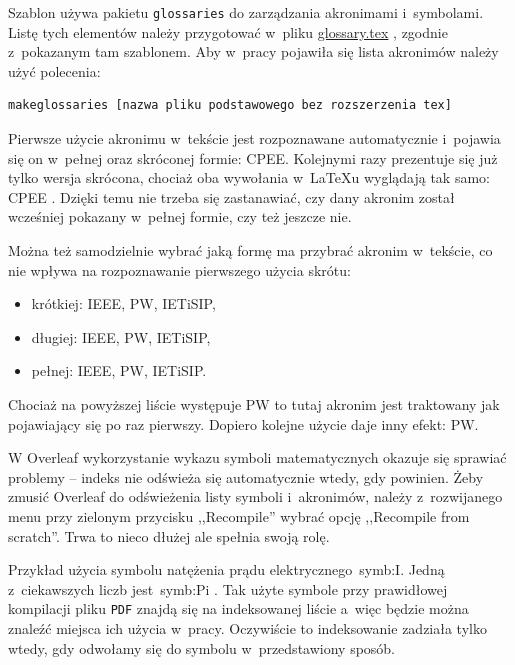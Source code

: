 Szablon używa pakietu \texttt{glossaries}
do zarządzania akronimami i~symbolami. Listę tych elementów należy przygotować w~pliku
\href{./glossary.tex}{glossary.tex}
, zgodnie z~pokazanym tam szablonem. Aby w~pracy pojawiła się lista akronimów należy użyć polecenia:

\begin{lstlisting}[language=bash,
    numbers=none,
    caption=Wygenerowanie listy skrótów i~symboli,
    label={lst:gloss}]
makeglossaries [nazwa pliku podstawowego bez rozszerzenia tex]
\end{lstlisting}

Pierwsze użycie akronimu w~tekście jest rozpoznawane automatycznie i~pojawia się on w~pełnej oraz skróconej formie:
\gls{CPEE}. Kolejnymi razy prezentuje się już tylko wersja skrócona, chociaż oba wywołania w~\LaTeX{u}
wyglądają tak samo: \gls{CPEE}
. Dzięki temu nie trzeba się zastanawiać, czy dany akronim został wcześniej pokazany w~pełnej formie, czy też jeszcze
nie.

Można też samodzielnie wybrać jaką formę ma przybrać akronim w~tekście, co nie wpływa na rozpoznawanie pierwszego użycia
skrótu:
\begin{itemize}
    \item krótkiej: \acrshort{IEEE}, \acrshort{PW}, \acrshort{IETiSIP},
    \item długiej: \acrlong{IEEE}, \acrlong{PW}, \acrlong{IETiSIP},
    \item pełnej: \acrfull{IEEE}, \acrfull{PW}, \acrfull{IETiSIP}.
\end{itemize}

Chociaż na powyższej liście występuje \gls{PW}
to tutaj akronim jest traktowany jak pojawiający się po raz pierwszy. Dopiero kolejne użycie daje inny efekt: \gls{PW}.

W Overleaf wykorzystanie wykazu symboli matematycznych okazuje się sprawiać problemy -- indeks nie odświeża się
automatycznie wtedy, gdy powinien. Żeby zmusić Overleaf do odświeżenia listy symboli i~akronimów, należy z~rozwijanego
menu przy zielonym przycisku ,,Recompile'' wybrać opcję ,,Recompile from scratch''. Trwa to nieco dłużej ale spełnia
swoją rolę.

Przykład użycia symbolu natężenia prądu elektrycznego~\gls{symb:I}. Jedną z~ciekawszych liczb jest~\gls{symb:Pi}
. Tak użyte symbole przy prawidłowej kompilacji pliku \texttt{PDF}
znajdą się na indeksowanej liście a~więc będzie można znaleźć miejsca ich użycia w~pracy. Oczywiście to indeksowanie
zadziała tylko wtedy, gdy odwołamy się do symbolu w~przedstawiony sposób.

